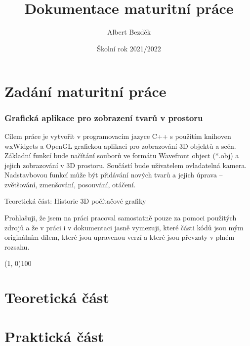 \documentclass[a4paper, 12pt]{report}
\begin{document}
\hfuzz=1pt
\title{
    {\fontsize{65}{75}\selectfont {}} \\ [0.7cm]
    {\LARGE Dokumentace maturitní práce}
}
\author{\LARGE Albert Bezděk}
\date{Školní rok 2021/2022}
\maketitle
{}

\chapter*{Zadání maturitní práce}
\subsection*{Grafická aplikace pro zobrazení tvarů v prostoru}
Cílem práce je vytvořit v programovacím jazyce C++ s použitím knihoven wxWidgets a OpenGL grafickou aplikaci pro zobrazování 3D objektů a scén. Základní funkcí bude načítání souborů ve formátu Wavefront object (*.obj) a jejich zobrazování v 3D prostoru. Součástí bude uživatelem ovladatelná kamera. Nadstavbovou funkcí může být přidávání nových tvarů a jejich úprava – zvětšování, zmenšování, posouvání, otáčení.

Teoretická část: Historie 3D počítačové grafiky

\pagebreak
\hspace{0pt}
\vfill
Prohlašuji, že jsem na práci pracoval samostatně pouze za pomoci použitých zdrojů a že v práci i v dokumentaci jasně vymezuji, které části kódů jsou mým originálním dílem, které jsou upravenou verzí a které jsou převzaty v plném rozsahu.
\bigskip
\begin{flushright}
    \line(1, 0){100}
\end{flushright}
\vfill
\hspace{0pt}

\setlength{\parskip}{\tocparskip}
\tableofcontents
\setlength{\parskip}{\bodyparskip}

\chapter{Teoretická část}

\chapter{Praktická část}
\end{document}

